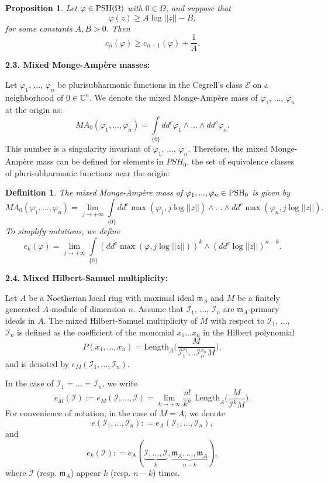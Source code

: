 \documentclass[a4paper,oneside,reqno,11pt]{article}
\newtheorem{proposition}[theorem]{Proposition}
\newtheorem{e-definition}[theorem]{Definition}
\def\PSH{\mathop{\rm PSH}\nolimits}
\begin{document}
\begin{proposition}\label{ltc_inequality} Let $\varphi\in\PSH(\Omega)$ with $0\in\Omega$, and suppose that
$$\varphi (z) \geq A \log || z || - B,$$ 
for some constants $A, B >0$. Then
$$c_{ n } ( \varphi ) \geq c_{ n-1 } ( \varphi )  + \frac { 1 } { A}.$$ 
\end{proposition}

{\bf 2.3. Mixed Monge-Amp\`{e}re masses:}

Let $\varphi_1$, ..., $\varphi_n$ be plurisubharmonic functions in the Cegrell's class $\mathcal E$ on a neighborhood of $0\in\mathbb C^{ n }$. We denote the mixed Monge-Amp\`{e}re mass of $\varphi_1$, ..., $\varphi_n$ at the origin as:
$$MA_{ 0 } ( \varphi_1 , ..., \varphi_n ) = \int\limits_{ \{ 0 \} } dd^c \varphi_1 \wedge ... \wedge dd^c \varphi_n.$$
This number is a singularity invariant of $\varphi_1$, ..., $\varphi_n$. Therefore, the mixed Monge-Amp\`{e}re mass can be defined for elements in $PSH_{ 0 }$, the set of equivalence classes of plurisubharmonic functions near the origin:

\begin{e-definition}\label{mix_Monge_Ampere_mass}
The mixed Monge-Amp\`{e}re mass of $\varphi_1, ...,\varphi_n\in \PSH_0$ is given by
$$MA_{ 0 } ( \varphi_1 , ..., \varphi_n ) = \lim\limits_{ j\to +\infty } \int\limits_{ \{ 0 \} } dd^c \max ( \varphi_1 , j \log || z || ) \wedge ... \wedge dd^c \max ( \varphi_n , j \log || z || ).$$
To simplify notations, we define
$$e_k ( \varphi ) = \lim\limits_{ j\to +\infty } \int\limits_{ \{ 0 \} } ( dd^c \max ( \varphi, j \log || z || ) )^{ k } \wedge ( dd^c \log || z || )^{ n-k }.$$
\end{e-definition}

{\bf 2.4. Mixed Hilbert-Samuel multiplicity:}

Let $A$ be a Noetherian local ring with maximal ideal $\mathfrak{m}_A$ and $M$ be a finitely generated $A$-module of dimension $n$. Assume that $\mathcal I_1$, ..., $\mathcal I_n$ are $\mathfrak{m}_A$-primary ideals in $A$. The mixed Hilbert-Samuel multiplicity of $M$ with respect to $\mathcal I_1$, ..., $\mathcal I_n$ is defined as the coefficient of the monomial $x_1...x_n$ in the Hilbert polynomial
$$P(x_1,...,x_n) = \text{Length}_A \big( \frac { M } { \mathcal I_1^{ x_1 } ... \mathcal I_n^{ x_n } M } \big),$$
and is denoted by $e_M ( \mathcal I_1, ..., \mathcal I_n )$.

In the case of $\mathcal I_1=... =\mathcal I_n$, we write
$$e_M ( \mathcal I ):= e_M ( \mathcal I, ..., \mathcal I ) = \lim\limits_{ k\to +\infty } \frac { n! } { k^n } \text{ Length}_A \big( \frac { M } { \mathcal I^{ k} M } \big).$$
For convenience of notation, in the case of $M=A$, we denote
$$e ( \mathcal I_1, ..., \mathcal I_n ): = e_A ( \mathcal I_1, ..., \mathcal I_n ),$$
and
$$e_k ( \mathcal I ): = e_A(\underbrace{\mathcal{I}, \dots, \mathcal{I}}_{k}, \underbrace{\mathfrak{m}_A, \dots, \mathfrak{m}_A}_{n-k}),$$
where $\mathcal I$ (resp. $\mathfrak{m}_A$) appear $k$ (resp. $n-k$) times.
\end{document}
